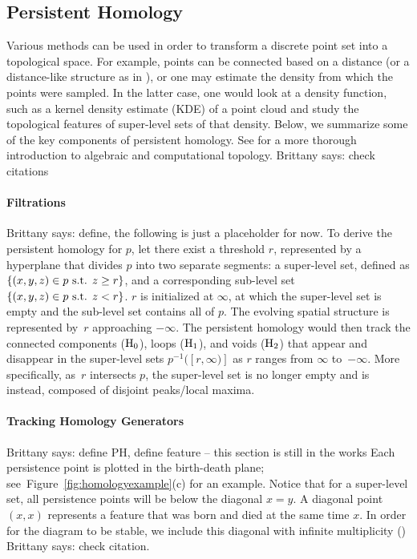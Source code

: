 \documentclass[12pt]{article}
\newcommand{\brittany}[1]{{\color{cyan} Brittany says: #1}}
\newcommand{\figref}[1]{Figure~\ref{#1}}
\begin{document}
\subsection{Persistent Homology} 
Various methods can be used in order to transform a discrete point set into a topological space. For example, points can be connected based on a distance (or
a distance-like structure as in \cite{chazal2011geometric}), or one may estimate the density from which the points were sampled. In the latter case, one would look at a density function, such as a kernel density estimate (KDE) of a point cloud and study the topological features of super-level sets of that density. Below, we summarize some of the key components of persistent homology. See \cite{edelsbrunner2010computational,hatcher2002algebraic,munkres1984elements} for a more thorough introduction to algebraic and computational topology. \brittany{check citations}

\paragraph{Filtrations}
\brittany{define, the following is just a placeholder for now.}
To derive the persistent homology for $p$, let there exist a threshold $r$, represented by a hyperplane that divides $p$ into two separate segments: a super-level set, defined as $\{(x,y,z) \in p \textup{ s.t. } z \geq r \}$, and a corresponding sub-level set $\{(x,y,z) \in p \textup{ s.t. } z < r \}$. $r$ is initialized at $\infty$, at which the super-level set is empty and the sub-level set contains all of $p$. The evolving spatial structure is represented by~$r$ approaching $-\infty$. The persistent homology would then track the connected
components ($\textup{H}_{0}$), loops ($\textup{H}_{1}$), and voids ($\textup{H}_{2}$) that appear and disappear in the super-level sets $p^{-1}([r,\infty)]$ as $r$ ranges from $\infty$ to~$-\infty$. More specifically, as~$r$ intersects $p$, the super-level set is no longer empty and is instead, composed of disjoint peaks/local maxima.


\paragraph{Tracking Homology Generators}
\brittany{define PH, define feature -- this section is still in the works}
Each persistence point is plotted in the birth-death plane; see~\figref{fig:homologyexample}(c) for an example. Notice that for a super-level set, all persistence points will be below the diagonal $x=y$. A
diagonal point $(x,x)$ represents a feature that was born and died at the same time $x$.  In order for the diagram to be stable, we include this diagonal with
infinite multiplicity (\cite{cohen2007stability}) \brittany{check citation}.  
\end{document}
